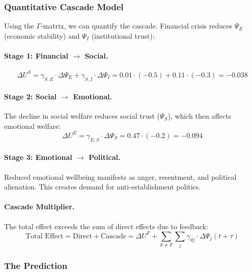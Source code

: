 \subsubsection{Quantitative Cascade Model}

Using the $\Gamma$-matrix, we can quantify the cascade. Financial crisis 
reduces $\Psi_E$ (economic stability) and $\Psi_I$ (institutional trust):

\paragraph{Stage 1: Financial $\to$ Social.}
\begin{equation}
\Delta U^S = \gamma_{S,E} \cdot \Delta \Psi_E + \gamma_{S,I} \cdot \Delta \Psi_I = 0.01 \cdot (-0.5) + 0.11 \cdot (-0.3) = -0.038
\end{equation}

\paragraph{Stage 2: Social $\to$ Emotional.}
The decline in social welfare reduces social trust ($\Psi_S$), which then affects emotional welfare:
\begin{equation}
\Delta U^E = \gamma_{E,S} \cdot \Delta \Psi_S = 0.47 \cdot (-0.2) = -0.094
\end{equation}

\paragraph{Stage 3: Emotional $\to$ Political.}
Reduced emotional wellbeing manifests as anger, resentment, and political alienation.
This creates demand for anti-establishment politics.

\paragraph{Cascade Multiplier.}
The total effect exceeds the sum of direct effects due to feedback:
\begin{equation}
\text{Total Effect} = \text{Direct} + \text{Cascade} = \Delta U^F + \sum_{d \neq F} \sum_{j} \gamma_{dj} \cdot \Delta \Psi_j(t+\tau)
\end{equation}

\subsubsection{The Prediction}

